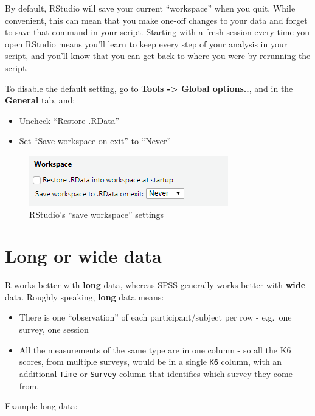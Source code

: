 \documentclass[
]{book}
\providecommand{\tightlist}{%
  \setlength{\itemsep}{0pt}\setlength{\parskip}{0pt}}
\begin{document}
By default, RStudio will save your current ``workspace'' when you
quit. While convenient, this can mean that you make one-off changes
to your data and forget to save that command in your script. Starting
with a fresh session every time you open RStudio means you'll learn
to keep every step of your analysis in your script, and you'll
know that you can get back to where you were by rerunning the script.

To disable the default setting, go to \textbf{Tools -\textgreater{} Global options..},
and in the \textbf{General} tab, and:

\begin{itemize}
\tightlist
\item
  Uncheck ``Restore .RData''
\item
  Set ``Save workspace on exit'' to ``Never''
\end{itemize}

\begin{figure}
\centering
\includegraphics{Images/WorkspaceSettings.png}
\caption{RStudio's ``save workspace'' settings}
\end{figure}

\hypertarget{long-or-wide-data}{%
\section{Long or wide data}\label{long-or-wide-data}}

R works better with \textbf{long} data, whereas SPSS generally works
better with \textbf{wide} data. Roughly speaking, \textbf{long} data means:

\begin{itemize}
\tightlist
\item
  There is one ``observation'' of each participant/subject per row - e.g.~one
  survey, one session
\item
  All the measurements of the same type are in one column - so all the
  K6 scores, from multiple surveys, would be in a single \texttt{K6} column,
  with an additional \texttt{Time} or \texttt{Survey} column that identifies which
  survey they come from.
\end{itemize}

Example long data:
\end{document}
